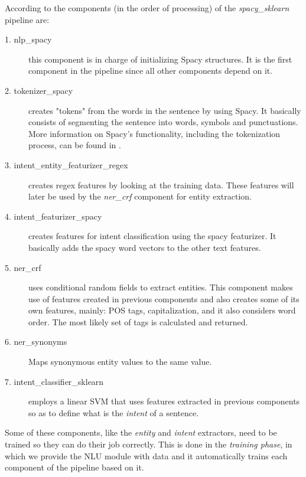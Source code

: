 \documentclass[11pt,a4paper]{article}
\begin{document}
			According to \cite{rasanichol} the components (in the order of processing) of the \textit{spacy\_sklearn} pipeline are:
			
			\begin{description}
				\item[1. nlp\_spacy] 
				this component is in charge of initializing Spacy structures. It is the first component in the pipeline since all other components depend on it. 
				
				\item[2. tokenizer\_spacy] 
				creates "tokens" from the words in the sentence by using Spacy. It basically consists of segmenting the sentence into words, symbols and punctuations. More information on Spacy's functionality, including the tokenization process, can be found in \cite{spacy-tokenization}.
				
				\item[3. intent\_entity\_featurizer\_regex] 
				creates regex features by looking at the training data. These features will later be used by the \textit{ner\_crf} component for entity extraction.
				
				\item[4. intent\_featurizer\_spacy] 
				creates features for intent classification using the spacy featurizer. It basically adds the spacy word vectors to the other text features.
				
				\item[5. ner\_crf] 
				uses conditional random fields to extract entities. This component makes use of features created in previous components and also creates some of its own features, mainly: POS tags, capitalization, and it also considers word order. The most likely set of tags is calculated and returned.
				
				\item[6. ner\_synonyms] 	
				Maps synonymous entity values to the same value. 
				
				\item[7. intent\_classifier\_sklearn] 
				employs a linear SVM that uses features extracted in previous components so as to define what is the \textit{intent} of a sentence.
				
			\end{description}
			
			Some of these components, like the \textit{entity} and \textit{intent} extractors, need to be trained so they can do their job correctly. This is done in the \textit{training phase}, in which we provide the NLU module with data and it automatically trains each component of the pipeline based on it.
\end{document}

